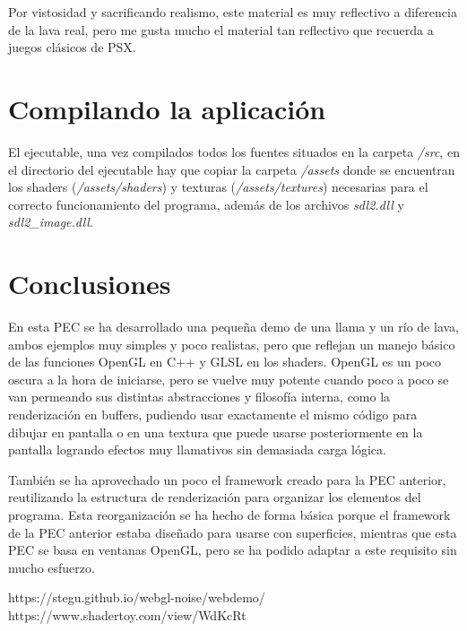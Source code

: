 \documentclass[12pt]{article}%
\begin{document}
	Por vistosidad y sacrificando realismo, este material es muy reflectivo a diferencia de la lava real, pero me gusta mucho el material tan reflectivo que recuerda a juegos clásicos de PSX.
	
%
	
\section{Compilando la aplicación}
	
	El ejecutable, una vez compilados todos los fuentes situados en la carpeta \textit{/src}, en el directorio del ejecutable hay que copiar la carpeta \textit{/assets} donde se encuentran los shaders (\textit{/assets/shaders}) y texturas (\textit{/assets/textures}) necesarias para el correcto funcionamiento del programa, además de los archivos \textit{sdl2.dll} y \textit{sdl2\_image.dll}.
	
	
\section{Conclusiones}
	En esta PEC se ha desarrollado una pequeña demo de una llama y un río de lava, ambos ejemplos muy simples y poco realistas, pero que reflejan un manejo básico de las funciones OpenGL en C++ y GLSL en los shaders. OpenGL es un poco oscura a la hora de iniciarse, pero se vuelve muy potente cuando poco a poco se van permeando sus distintas abstracciones y filosofía interna, como la renderización en buffers, pudiendo usar exactamente el mismo código para dibujar en pantalla o en una textura que puede usarse posteriormente en la pantalla logrando efectos muy llamativos sin demasiada carga lógica.
	
	También se ha aprovechado un poco el framework creado para la PEC anterior, reutilizando la estructura de renderización para organizar los elementos del programa. Esta reorganización se ha hecho de forma básica porque el framework de la PEC anterior estaba diseñado para usarse con superficies, mientras que esta PEC se basa en ventanas OpenGL, pero se ha podido adaptar a este requisito sin mucho esfuerzo.
	
	
\begin{thebibliography}{9}
 https://stegu.github.io/webgl-noise/webdemo/
 https://www.shadertoy.com/view/WdKcRt
\end{thebibliography}
\end{document}
